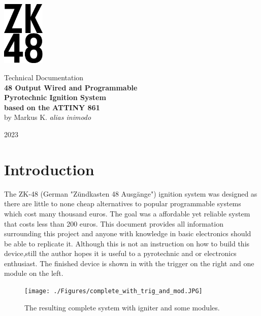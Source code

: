 


\begin{titlepage}
\begin{center}
\vspace*{1cm}
\includegraphics[width=2cm]{./Figures/zk_48_logo.png}
\vspace*{1cm}

\Huge {Technical Documentation\\} 
\vspace*{1cm}
\Huge{\textbf{48 Output Wired and Programmable\\ Pyrotechnic Ignition System\\ based on the ATTINY 861\\}}
\vspace*{0.5cm} 
\Large{by Markus K. \textit{alias inimodo}}
\vspace*{0.5cm}

\Large{2023}
\end{center}
\end{titlepage}

\pagebreak 

\tableofcontents

\pagebreak

\section{Introduction}
The ZK-48 (German "Zündkasten 48 Ausgänge") ignition system was designed as there are little to none cheap alternatives to popular programmable systems which cost many thousand euros. The goal was a  affordable yet reliable system that costs less than 200 euros. This document provides all information surrounding this project and anyone with knowledge in basic electronics should be able to replicate it. Although this is not an instruction on how to build this device,still the author hopes it is useful to a pyrotechnic and or electronics enthusiast. The finished device is shown in  with the trigger on the right and one module on the left.

\begin{figure}[!ht]
    \centering
    \texttt{[image: ./Figures/complete\_with\_trig\_and\_mod.JPG]}
    \caption{The resulting complete system with igniter and some modules.}
    \label{fig:complete_with_trig_and_mod}     
\end{figure}

